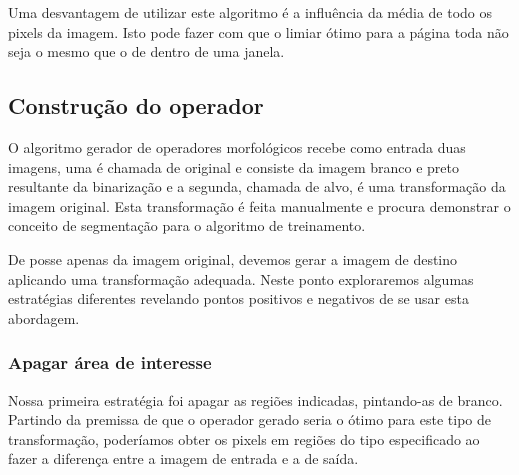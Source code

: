 \documentclass[a4paper,11pt]{article}
\begin{document}
      Uma desvantagem de utilizar este algoritmo é a influência da média de todo os pixels da imagem. Isto pode fazer com que o limiar ótimo para a página toda não seja o mesmo que o de dentro de uma janela.


    \subsection{Construção do operador}

      O algoritmo gerador de operadores morfológicos recebe como entrada duas imagens, uma é chamada de original e consiste da imagem branco e preto resultante da binarização e a segunda, chamada de alvo, é uma transformação da imagem original. Esta transformação é feita manualmente e procura demonstrar o conceito de segmentação para o algoritmo de treinamento.


      De posse apenas da imagem original, devemos gerar a imagem de destino aplicando uma transformação adequada. Neste ponto exploraremos algumas estratégias diferentes revelando pontos positivos e negativos de se usar esta abordagem.

      \subsubsection{Apagar área de interesse}

        Nossa primeira estratégia foi apagar as regiões indicadas, pintando-as de branco. Partindo da premissa de que o operador gerado seria o ótimo para este tipo de transformação, poderíamos obter os pixels em regiões do tipo especificado ao fazer a diferença entre a imagem de entrada e a de saída.
\end{document}
